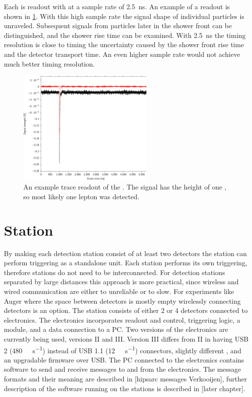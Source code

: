 Each \pmt is readout with \adcs at a sample rate of \SI{2.5}{\ns}. An example of a readout is shown in \cref{fig:trace}. With this high sample rate the signal shape of individual particles is unraveled. Subsequent signals from particles later in the shower front can be distinguished, and the shower rise time can be examined. With \SI{2.5}{\ns} the timing resolution is close to timing the uncertainty caused by the shower front rise time and the detector transport time. An even higher sample rate would not achieve much better timing resolution.

\begin{figure}
    \centering
    \includegraphics[width=0.6\textwidth]
                    {plots/experiment/trace}
    \caption{An example trace readout of the \pmt. The signal has the height of one \mip, so most likely one lepton was detected.}
    \label{fig:trace}
\end{figure}


\section{Station}

By making each detection station consist of at least two detectors the station can perform triggering as a standalone unit. Each station performs its own triggering, therefore stations do not need to be interconnected. For detection stations separated by large distances this approach is more practical, since wireless and wired communication are either to unreliable or to slow. For experiments like Auger where the space between detectors is mostly empty wirelessly connecting detectors is an option. The \hisparc station consists of either 2 or 4 detectors connected to \hisparc electronics. The \hisparc electronics incorporates \pmt readout and control, triggering logic, a \gps module, and a data connection to a PC. Two versions of the electronics are currently being used, versions II and III. Version III differs from II in having USB 2 (\SI{480}{\mega\bit\per\second}) instead of USB 1.1 (\SI{12}{\mega\bit\per\second}) connectors, slightly different \adcs, and an upgradable firmware over USB. The PC connected to the electronics contains software to send and receive messages to and from the \hisparc electronics. The message formats and their meaning are described in [hipsarc messages Verkooijen], further description of the software running on the stations is described in [later chapter].

